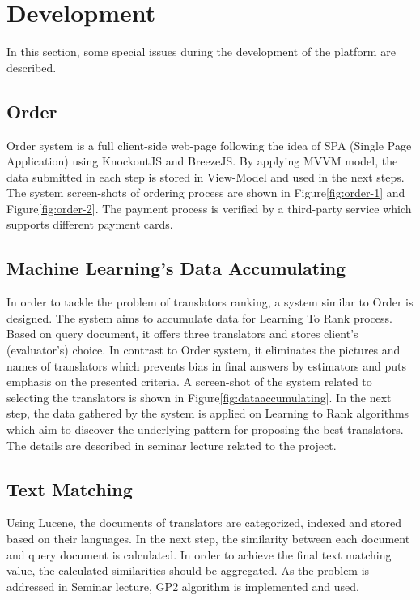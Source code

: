 \section{Development}
\label{sec:development}
In this section, some special issues during the development of the platform are described.

\subsection{Order}
Order system is a full client-side web-page following the idea of SPA (Single Page Application) using KnockoutJS and BreezeJS. By applying MVVM model, the data submitted in each step is stored in View-Model and used in the next steps. The system screen-shots of ordering process are shown in Figure\ref{fig:order-1} and Figure\ref{fig:order-2}.  The payment process is verified by a third-party service which supports different payment cards.

\subsection{Machine Learning's Data Accumulating}
In order to tackle the problem of translators ranking, a system similar to Order is designed. The system aims to accumulate data for Learning To Rank process. Based on query document, it offers three translators and stores client's (evaluator's) choice. In contrast to Order system, it eliminates the pictures and names of translators which prevents bias in final answers by estimators and puts emphasis on the presented criteria. A screen-shot of the system related to selecting the translators is shown in Figure\ref{fig:dataaccumulating}. In the next step, the data gathered by the system is applied on Learning to Rank algorithms which aim to discover the underlying pattern for proposing the best translators. The details are described in seminar lecture related to the project. 

\subsection{Text Matching}
Using Lucene, the documents of translators are categorized, indexed and stored based on their languages. In the next step, the similarity between each document and query document is calculated. In order to achieve the final text matching value, the calculated similarities should be aggregated. As the problem is addressed in Seminar lecture, GP2\cite{gp2} algorithm is implemented and used.

